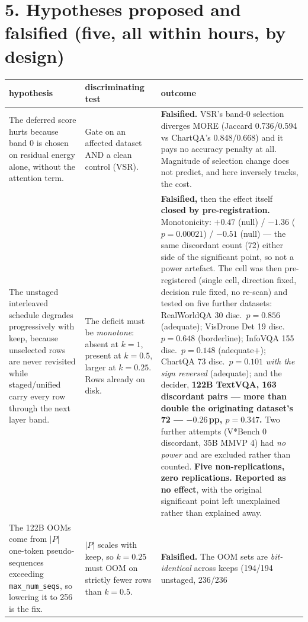 \documentclass[10pt]{article}
\newcommand{\hh}[1]{\textbf{#1}}
\begin{document}
\section*{5. Hypotheses proposed and falsified (five, all within hours, by design)}

\begin{table}[h]\centering\small
\begin{tabular}{p{}p{}p{}}
\toprule
hypothesis & discriminating test & outcome \\
\midrule
The deferred score hurts because band 0 is chosen on residual energy alone, without the attention
term. &
Gate on an affected dataset AND a clean control (VSR). &
\hh{Falsified.} VSR's band-0 selection diverges MORE (Jaccard 0.736/0.594 vs ChartQA's
0.848/0.668) and it pays no accuracy penalty at all. Magnitude of selection change does not
predict, and here inversely tracks, the cost. \\
\addlinespace
The unstaged interleaved schedule degrades progressively with keep, because unselected rows are
never revisited while staged/unified carry every row through the next layer band. &
The deficit must be \emph{monotone}: absent at $k{=}1$, present at $k{=}0.5$, larger at $k{=}0.25$.
Rows already on disk. &
\hh{Falsified,} then the effect itself \hh{closed by pre-registration.} Monotonicity: $+0.47$
(null) / $-1.36$ ($p{=}0.00021$) / $-0.51$ (null) --- the same discordant count (72) either side of
the significant point, so not a power artefact. The cell was then pre-registered (single cell,
direction fixed, decision rule fixed, no re-scan) and tested on five further datasets:
RealWorldQA 30 disc.\ $p{=}0.856$ (adequate); VisDrone Det 19 disc.\ $p{=}0.648$ (borderline);
InfoVQA 155 disc.\ $p{=}0.148$ (adequate$+$); ChartQA 73 disc.\ $p{=}0.101$ \emph{with the sign
reversed} (adequate); and the decider, \hh{122B TextVQA, 163 discordant pairs --- more than double
the originating dataset's 72 --- $-0.26$\,pp, $p{=}0.347$.} Two further attempts (V*Bench 0
discordant, 35B MMVP 4) had \emph{no power} and are excluded rather than counted.
\hh{Five non-replications, zero replications. Reported as no effect}, with the original
significant point left unexplained rather than explained away. \\
\addlinespace
The 122B OOMs come from $|P|$ one-token pseudo-sequences exceeding \texttt{max\_num\_seqs}, so
lowering it to 256 is the fix. &
$|P|$ scales with keep, so $k{=}0.25$ must OOM on strictly fewer rows than $k{=}0.5$. &
\hh{Falsified.} The OOM sets are \emph{bit-identical} across keeps (194/194 unstaged, 236/236

\end{tabular}
\end{table}
\end{document}
